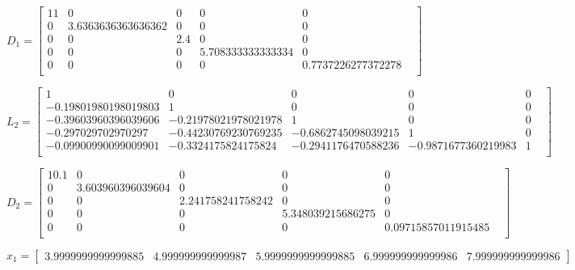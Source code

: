 \documentclass[12pt]{report}
\begin{document}
\vspace{0.5cm}\hspace{-0.2cm}$D_{1} = 
\begin{bmatrix}
     11 &         0 &         0 &         0 &         0 & \\
         0 &3.6363636363636362 &         0 &         0 &         0 & \\
         0 &         0 &       2.4 &         0 &         0 & \\
         0 &         0 &         0 &5.708333333333334 &         0 & \\
         0 &         0 &         0 &         0 &0.7737226277372278 & \\
\end{bmatrix}
$

\vspace{0.5cm}\hspace{-2.3cm}$L_{2} = 
\begin{bmatrix}
       1 &         0 &         0 &         0 &         0 & \\
-0.19801980198019803 &         1 &         0 &         0 &         0 & \\
-0.39603960396039606 &-0.21978021978021978 &         1 &         0 &         0 & \\
-0.297029702970297 &-0.44230769230769235 &-0.6862745098039215 &         1 &         0 & \\
-0.09900990099009901 &-0.3324175824175824 &-0.2941176470588236 &-0.9871677360219983 &         1 & \\
\end{bmatrix}
$

\vspace{0.5cm}\hspace{-1.6cm}$D_{2} = 
\begin{bmatrix}
     10.1 &         0 &         0 &         0 &         0 & \\
         0 &3.603960396039604 &         0 &         0 &         0 & \\
         0 &         0 &2.241758241758242 &         0 &         0 & \\
         0 &         0 &         0 &5.348039215686275 &         0 & \\
         0 &         0 &         0 &         0 &0.09715857011915485 & \\
\end{bmatrix}
$

\vspace{0.5cm}\hspace{-2.6cm}$x_{1} = 
\begin{bmatrix}
     3.9999999999999885 & 4.999999999999987 & 5.9999999999999885 & 6.999999999999986 & 7.999999999999986
\end{bmatrix}
$
\end{document}

